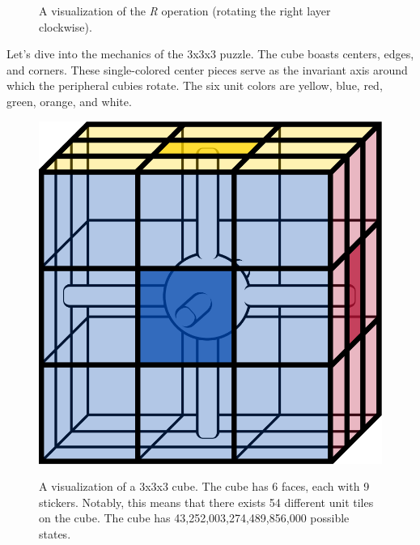 \documentclass[12pt]{article}
\begin{document}
\begin{figure}[h]
\begin{minipage}[c]{0.2\textwidth}
    \end{minipage}
    \caption{A visualization of the \textit{R} operation (rotating the right layer clockwise).}
\end{figure}

Let's dive into the mechanics of the 3x3x3 puzzle. The cube boasts centers, edges, and corners. These single-colored center pieces serve as the invariant axis around which the peripheral cubies rotate. The six unit colors are yellow, blue, red, green, orange, and white.

\begin{figure}[h]
    \hfill 
    \begin{minipage}[c]{0.2\textwidth} 
        \centering
        \includegraphics[scale=0.1]{core.png}
    \end{minipage}
    \hfill 
    \begin{minipage}[c]{0.59\textwidth} 
        \vspace*{\fill} 
        A visualization of a 3x3x3 cube. The cube has 6 faces, each with 9 stickers. Notably, this means that there exists 54 different unit tiles on the cube. The cube has 43,252,003,274,489,856,000 possible states.\footnotemark
        \vspace*{\fill}
    \end{minipage}
    \hfill 
\end{figure}
\end{document}
